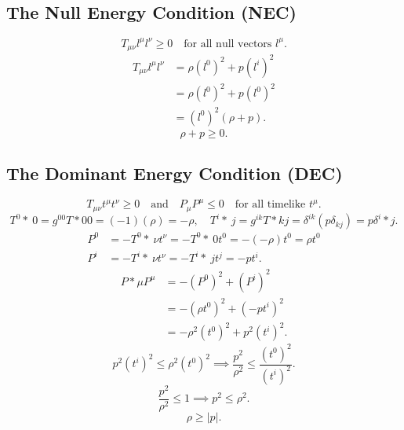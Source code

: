 \documentclass[11pt, a4paper]{report}
\begin{document}
\subsection{The Null Energy Condition (NEC)}
\begin{equation}
T_{\mu\nu} l^{\mu} l^{\nu} \ge 0 \quad \text{for all null vectors } l^{\mu}.
\end{equation}
\begin{align}
T_{\mu\nu} l^{\mu} l^{\nu} &= \rho(l^{0})^{2} + p(l^{i})^{2} \nonumber \\
&= \rho(l^{0})^{2} + p(l^{0})^{2} \nonumber \\
&= (l^{0})^{2}(\rho + p).
\end{align}
\begin{equation}
\rho + p \ge 0.
\end{equation}

\subsection{The Dominant Energy Condition (DEC)}
\begin{equation}
T_{\mu\nu} t^{\mu} t^{\nu} \ge 0 \quad \text{and} \quad P_{\mu}P^{\mu} \le 0 \quad \text{for all timelike } t^{\mu}.
\end{equation}
\begin{equation}
T^{0}*{\ 0} = g^{00}T*{00} = (-1)(\rho) = -\rho, \quad T^{i}*{\ j} = g^{ik}T*{kj} = \delta^{ik}(p \delta_{kj}) = p \delta^{i}*{j}.
\end{equation}
\begin{align}
P^{0} &= -T^{0}*{\ \nu} t^{\nu} = -T^{0}*{\ 0} t^{0} = -(-\rho)t^{0} = \rho t^{0} \\
P^{i} &= -T^{i}*{\ \nu} t^{\nu} = -T^{i}*{\ j} t^{j} = -p t^{i}.
\end{align}
\begin{align}
P*{\mu}P^{\mu} &= -(P^{0})^{2} + (P^{i})^{2} \nonumber \\
&= -(\rho t^{0})^{2} + (-p t^{i})^{2} \nonumber \\
&= -\rho^{2}(t^{0})^{2} + p^{2}(t^{i})^{2}.
\end{align}
\begin{equation}
p^{2}(t^{i})^{2} \le \rho^{2}(t^{0})^{2} \implies \frac{p^{2}}{\rho^{2}} \le \frac{(t^{0})^{2}}{(t^{i})^{2}}.
\end{equation}
\begin{equation}
\frac{p^{2}}{\rho^{2}} \le 1 \implies p^{2} \le \rho^{2}.
\end{equation}
\begin{equation}
\rho \ge |p|.
\end{equation}
\end{document}
